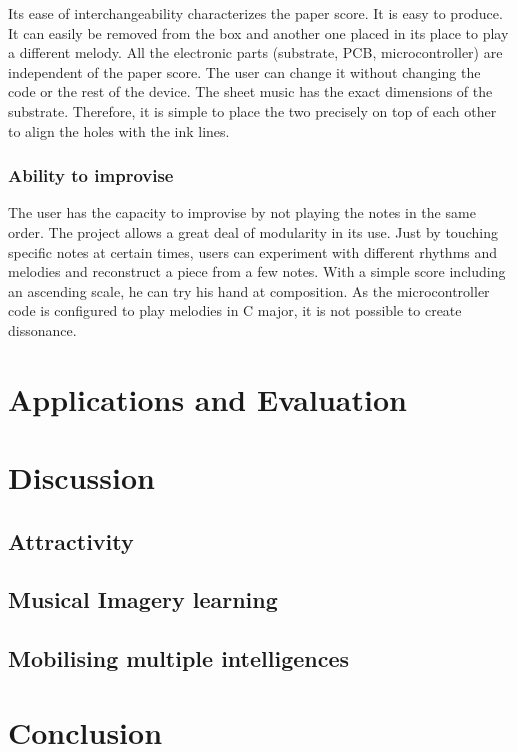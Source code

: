 Its ease of interchangeability characterizes the paper score. It is easy to produce. It
can easily be removed from the box and another one placed in its place to play a
different melody. All the electronic parts (substrate, PCB, microcontroller) are
independent of the paper score. The user can change it without changing the code or
the rest of the device. The sheet music has the exact dimensions of the substrate.
Therefore, it is simple to place the two precisely on top of each other to align the
holes with the ink lines.
\subsubsection{Ability to improvise} 

The user has the capacity to improvise by not playing the notes in the same order.
The project allows a great deal of modularity in its use. Just by touching specific
notes at certain times, users can experiment with different rhythms and melodies
and reconstruct a piece from a few notes.
With a simple score including an ascending scale, he can try his hand at composition.
As the microcontroller code is configured to play melodies in C major, it is not
possible to create dissonance.


\section{Applications and Evaluation}

\section{Discussion}

\subsection{Attractivity}

\subsection{Musical Imagery learning}

\subsection{Mobilising multiple intelligences}

\section{Conclusion}

